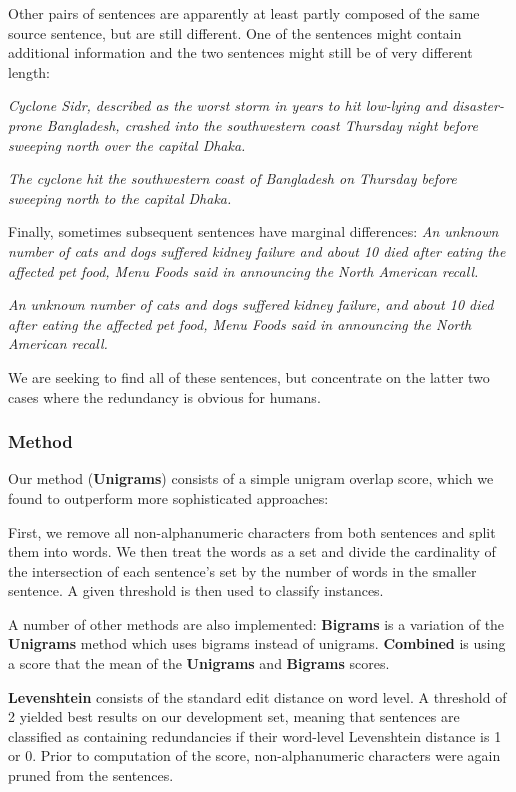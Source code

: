 \documentclass[a4paper,10pt]{scrartcl}
\theoremstyle{style}
\begin{document}
Other pairs of sentences are apparently at least partly composed of the same source sentence, but are still different. One of the sentences might contain additional information and the two sentences might still be of very different length:

\textit{Cyclone Sidr, described as the worst storm in years to hit low-lying and disaster-prone Bangladesh, crashed into the southwestern coast Thursday night before sweeping north over the capital Dhaka.}

\textit{The cyclone hit the southwestern coast of Bangladesh on Thursday before sweeping north to the capital Dhaka.}

Finally, sometimes subsequent sentences have marginal differences:
\textit{An unknown number of cats and dogs suffered kidney failure and about 10 died after eating the affected pet food, Menu Foods said in announcing the North American recall.}

\textit{An unknown number of cats and dogs suffered kidney failure, and about 10 died after eating the affected pet food, Menu Foods said in announcing the North American recall.}

We are seeking to find all of these sentences, but concentrate on the latter two cases where the redundancy is obvious for humans.

\subsubsection{Method}

Our method (\textbf{Unigrams}) consists of a simple unigram overlap score, which we found to outperform more sophisticated approaches:

First, we remove all non-alphanumeric characters from both sentences and split them into words. We then treat the words as a set and divide the cardinality of the intersection of each sentence's set by the number of words in the smaller sentence. A given threshold is then used to classify instances.

A number of other methods are also implemented: \textbf{Bigrams} is a variation of the \textbf{Unigrams} method which uses bigrams instead of unigrams. \textbf{Combined} is using a score that the mean of the \textbf{Unigrams} and \textbf{Bigrams} scores.

\textbf{Levenshtein} consists of the standard edit distance\citep{levenshtein1966binary} on word level. A threshold of 2 yielded best results on our development set, meaning that sentences are classified as containing redundancies if their word-level Levenshtein distance is 1 or 0. Prior to computation of the score, non-alphanumeric characters were again pruned from the sentences.
\end{document}
